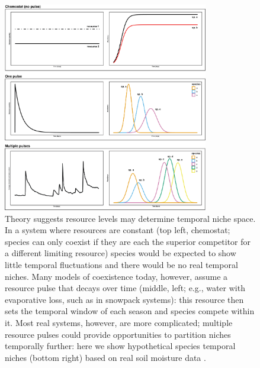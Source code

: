\documentclass[11pt]{article}
\begin{document}
\begin{figure}[h!]
\centering
\includegraphics[width=0.8\textwidth]{..//figures/figsubmit/sixpanel_concept_increasespp.png}
\caption{Theory suggests resource levels may determine temporal niche space. In a system where resources are constant (top left, chemostat; species can only coexist if they are each the superior competitor for a different limiting resource) species would be expected to show little temporal fluctuations and there would be no real temporal niches. Many models of coexistence today, however, assume a resource pulse that decays over time (middle, left; e.g., water with evaporative loss, such as in snowpack systems): this resource then sets the temporal window of each season and species compete within it. Most real systems, however, are more complicated; multiple resource pulses could provide opportunities to partition niches temporally further: here we show hypothetical species temporal niches (bottom right) based on real soil moisture data \citep[bottom left, taken from Jornada LTER site 302, showing soil moisture at 10 cm depth over the year in 2018,][]{jornadadat}.} 

 \label{fig:resource}
\end{figure}
\end{document}
